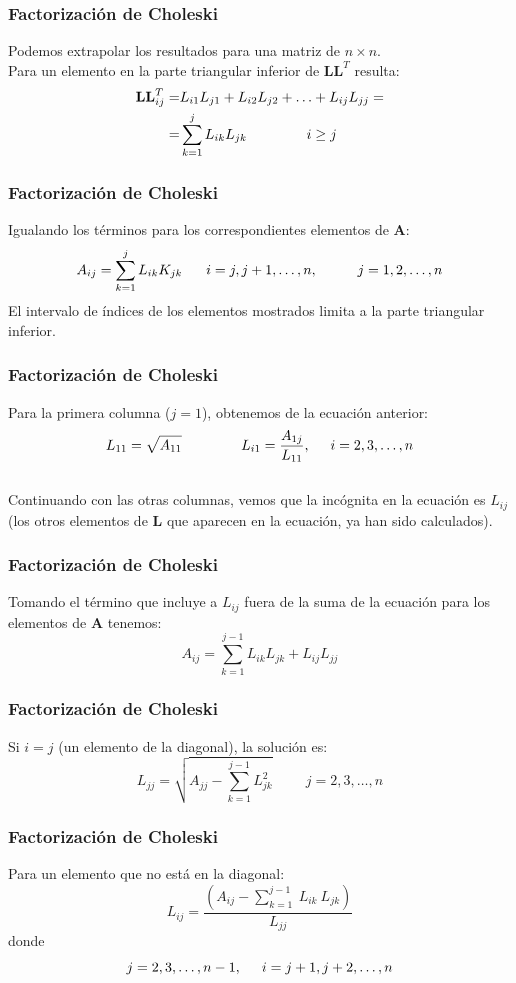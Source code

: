 \begin{frame}
\frametitle{Factorización de Choleski}
Podemos extrapolar los resultados para una matriz de $n \times n$.
\\
\bigskip
Para un elemento en la parte triangular inferior de $\mathbf{LL}^{T}$ resulta:
\[ \begin{split}
	\mathbf{LL}^{T}_{ij}=& L_{i1}L_{j1} + L_{i2}L_{j2} + \ldots + L_{ij}L_{jj} = \\
	=& \sum_{k=1}^{j} L_{ik}L_{jk} \hspace{1.5cm} i \geq j \end{split} \]
\end{frame}
\begin{frame}
\frametitle{Factorización de Choleski}
Igualando los términos para los correspondientes elementos de $\mathbf{A}$:
\[ A_{ij} = \sum_{k=1}^{j} L_{ik}K_{jk} \hspace{0.6cm} i=j,j+1,\ldots,n, \hspace{1cm} j=1,2,\ldots,n \]
El intervalo de índices de los elementos mostrados limita a la parte triangular inferior. 
\end{frame}
\begin{frame}
\frametitle{Factorización de Choleski}
Para la primera columna ($j = 1$), obtenemos de la ecuación anterior:
\[ L_{11} = \sqrt{A_{11}} \hspace{1.5cm} L_{i1} = \dfrac{A_{1j}}{L_{11}}, \hspace{0.5cm} i=2,3,\ldots, n\]
\\
\bigskip
Continuando con las otras columnas, vemos que la incógnita en la ecuación es $L_{ij}$ (los otros elementos de $\mathbf{L}$ que aparecen en la ecuación, ya han sido calculados). 
\end{frame}
\begin{frame}
\frametitle{Factorización de Choleski}
Tomando el término que incluye a $L_{ij}$ fuera de la suma de la ecuación para los elementos de $\mathbf{A}$ tenemos:
\[ A_{ij} = \sum_{k=1}^{j-1} L_{ik}L_{jk} + L_{ij}L_{jj} \]
\end{frame}
\begin{frame}
\frametitle{Factorización de Choleski}
Si $i = j$ (un elemento de la diagonal), la solución es:
\[ L_{jj} = \sqrt{A_{jj} - \sum_{k=1
}^{j-1}L_{jk}^{2}} \hspace{1cm} j=2,3,\ldots, n \]
\end{frame}
\begin{frame}
\frametitle{Factorización de Choleski}
Para un elemento que no está en la diagonal:
\begin{equation*}
 L_{ij} = \dfrac{\left( A_{ij} - \sum\limits_{k = 1}^{j-1} \: L_{ik} \: L_{jk} \right)}{L_{jj}}
 \end{equation*}
donde 
\[ j=2,3,\ldots,n-1, \hspace{0.5cm} i=j+1,j+2,\ldots,n \]
\end{frame}
